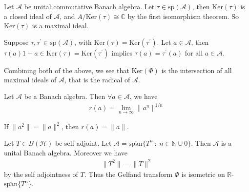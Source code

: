 \begin{remark}
  Let $\mathcal{A}$ be unital commutative Banach algebra. Let $\tau
  \in \textrm{sp}(\mathcal{A})$, then $\textrm{Ker}(\tau)$ is a
  closed ideal of $\mathcal{A}$, and $A/\textrm{Ker}(\tau) \cong
  \mathbb{C}$ by the first isomorphism theorem. So
  $\textrm{Ker}(\tau)$ is a maximal ideal.
\end{remark}

\begin{remark}
  Suppose $\tau, \tau^\prime \in \textrm{sp}(\mathcal{A})$, with
  $\textrm{Ker}(\tau) =\textrm{Ker}(\tau^\prime)$. Let $a \in
  \mathcal{A}$, then $\tau(a)1 - a \in \textrm{Ker}(\tau) =
  \textrm{Ker}(\tau^\prime)$ implies $\tau(a) = \tau^\prime(a)$ for
  all $a \in \mathcal{A}$.
\end{remark}

\begin{remark}
  Combining both of the above, we see that $\textrm{Ker}(\Phi)$ is
  the intersection of all maximal ideals of $\mathcal{A}$, that is
  the radical of $\mathcal{A}$.
\end{remark}

\begin{theorem}
  Let $\mathcal{A}$ be a Banach algebra. Then $\forall a \in
  \mathcal{A}$, we have
  \begin{align*}
    r(a) = \lim_{n \to \infty} \|a^n\|^{1/n}
  \end{align*}
\end{theorem}

\begin{corollary}
  If $\|a^2\| = \|a\|^2$, then $r(a) = \|a\|$.
\end{corollary}

\begin{example}
  Let $T \in B(\mathcal{H})$ be self-adjoint. Let $\mathcal{A} =
  \overline{\textrm{span}}\{ T^n  \ : \  n \in \mathbb{N} \cup {0}
  \}$. Then $\mathcal{A}$ is a unital Banach algebra. Moreover we have
  \begin{align*}
    \|T^2\| = \|T\|^{2}
  \end{align*}
  by the self adjointness of $T$. Thus the Gelfand transform $\Phi$
  is isometric on $\mathbb{R}$-$\overline{\textrm{span}}\{T^n\}$.
\end{example}
